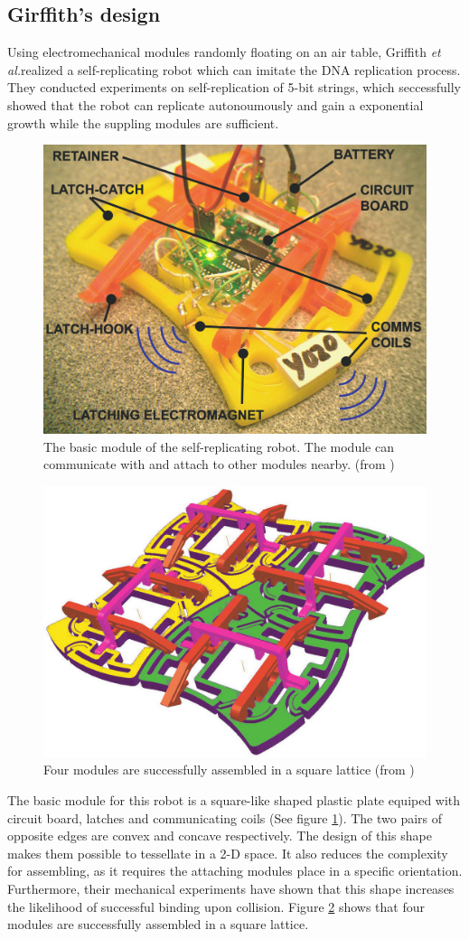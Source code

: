 \documentclass[12pt,twoside]{article}
\theoremstyle{plain}
\theoremstyle{definition}
\theoremstyle{remark}
\newcommand{\etal}{\textit{et al.}}
\begin{document}
\subsection{Girffith's design}
Using electromechanical modules randomly floating on an air table, Griffith \etal realized a self-replicating robot which can imitate the DNA replication process\cite{griffith_growing_2004}\cite{griffith_self-replication_2005}. They conducted experiments on self-replication of 5-bit strings, which seccessfully showed that the robot can replicate autonoumously and gain a exponential growth while the suppling modules are sufficient.

\begin{figure}[thbp]
	 \centerline{\includegraphics[width=.4\textwidth]{griffith-000}}
	 {\caption{The basic module of the self-replicating robot. The module can communicate with and attach to other modules nearby. (from \cite{griffith_growing_2004})}
	 \label{fig:gri-unit}}
\end{figure}

\begin{figure}[thbp]
	 \centerline{\includegraphics[width=.4\textwidth]{griffith-001}}
	 {\caption{Four modules are successfully assembled in a square lattice (from \cite{griffith_growing_2004})}
	 \label{fig:gri-sqr}}
\end{figure}

The basic module for this robot is a square-like shaped plastic plate equiped with circuit board, latches and communicating coils (See figure \ref{fig:gri-unit}). The two pairs of opposite edges are convex and concave respectively. The design of this shape makes them possible to tessellate in a 2-D space. It also reduces the complexity for assembling, as it requires the attaching modules place in a specific orientation. Furthermore, their mechanical experiments have shown that this shape increases the likelihood of successful binding upon collision. Figure \ref{fig:gri-sqr} shows that four modules are successfully assembled in a square lattice. 
\end{document}
